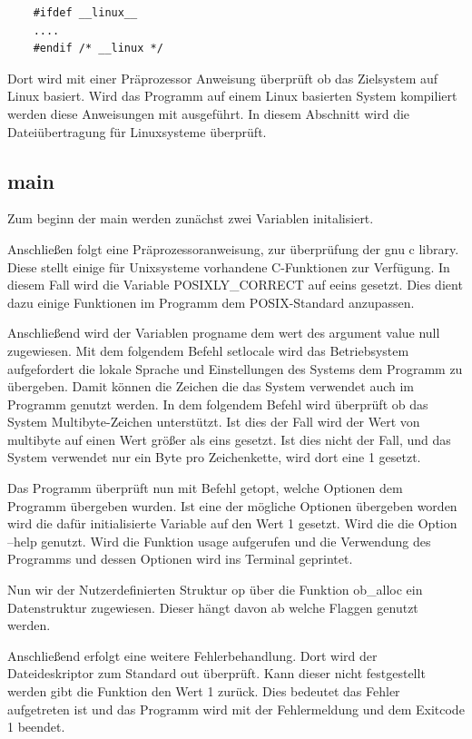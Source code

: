 {\begin{lstlisting}
	#ifdef __linux__
	....
	#endif /* __linux */
\end{lstlisting}

Dort wird mit einer Präprozessor Anweisung überprüft ob das Zielsystem auf Linux basiert.
Wird das Programm auf einem Linux basierten System kompiliert werden diese Anweisungen mit ausgeführt.
In diesem Abschnitt wird die Dateiübertragung für Linuxsysteme überprüft.

\subsection{main}
Zum beginn der main werden zunächst zwei Variablen initalisiert.\par
Anschließen folgt eine Präprozessoranweisung, zur überprüfung der gnu c library.
Diese stellt einige für Unixsysteme vorhandene C-Funktionen zur Verfügung.
In diesem Fall wird die Variable POSIXLY\_CORRECT auf eeins gesetzt.
Dies dient dazu einige Funktionen im Programm dem POSIX-Standard anzupassen.\par
Anschließend wird der Variablen progname dem wert des argument value null zugewiesen.
Mit dem folgendem Befehl setlocale wird das Betriebsystem aufgefordert die lokale Sprache und Einstellungen des Systems dem Programm zu übergeben.
Damit können die Zeichen die das System verwendet auch im Programm genutzt werden.
In dem folgendem Befehl wird überprüft ob das System Multibyte-Zeichen unterstützt. 
Ist dies der Fall wird der Wert von multibyte auf einen Wert größer als eins gesetzt.
Ist dies nicht der Fall, und das System verwendet nur ein Byte pro Zeichenkette, wird dort eine 1 gesetzt.\par
Das Programm überprüft nun mit Befehl getopt, welche Optionen dem Programm übergeben wurden. 
Ist eine der mögliche Optionen übergeben worden wird die dafür initialisierte Variable auf den Wert 1 gesetzt.
Wird die die Option --help genutzt. Wird die Funktion usage aufgerufen und die Verwendung des Programms und dessen Optionen wird ins Terminal geprintet.\par
Nun wir der Nutzerdefinierten Struktur op über die Funktion ob\_alloc ein Datenstruktur zugewiesen.
Dieser hängt davon ab welche Flaggen genutzt werden.\par
Anschließend erfolgt eine weitere Fehlerbehandlung.
Dort wird der Dateideskriptor zum Standard out überprüft.
Kann dieser nicht festgestellt werden gibt die Funktion den Wert 1 zurück.
Dies bedeutet das Fehler aufgetreten ist und das Programm wird mit der Fehlermeldung und dem Exitcode 1 beendet.\par
}
